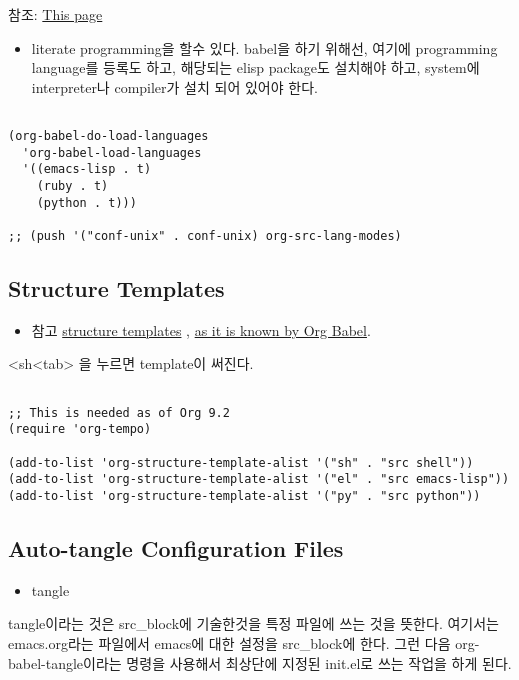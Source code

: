 \documentclass[11pt]{article}
\begin{document}
참조:  \href{https://orgmode.org/worg/org-contrib/babel/languages.html}{This page} 
\begin{itemize}
\item literate programming을 할수 있다.  babel을 하기 위해선, 여기에 programming language를 등록도 하고, 해당되는 elisp package도 설치해야 하고, system에 interpreter나 compiler가 설치 되어 있어야 한다.
\end{itemize}

\begin{verbatim}

(org-babel-do-load-languages
  'org-babel-load-languages
  '((emacs-lisp . t)
    (ruby . t)
    (python . t)))

;; (push '("conf-unix" . conf-unix) org-src-lang-modes)

\end{verbatim}
\subsection*{Structure Templates}
\label{sec:orgb3db85f}
\begin{itemize}
\item 참고
\href{https://orgmode.org/manual/Structure-Templates.html}{structure templates} , \href{https://orgmode.org/worg/org-contrib/babel/languages.html}{as it is known by Org Babel}.
\end{itemize}
<sh<tab> 을 누르면 template이 써진다.
\begin{verbatim}

;; This is needed as of Org 9.2
(require 'org-tempo)

(add-to-list 'org-structure-template-alist '("sh" . "src shell"))
(add-to-list 'org-structure-template-alist '("el" . "src emacs-lisp"))
(add-to-list 'org-structure-template-alist '("py" . "src python"))

\end{verbatim}

\subsection*{Auto-tangle Configuration Files}
\label{sec:org213c323}
\begin{itemize}
\item tangle
\end{itemize}
tangle이라는 것은 src\_block에 기술한것을 특정 파일에 쓰는 것을
뜻한다. 여기서는 emacs.org라는 파일에서 emacs에 대한 설정을
src\_block에 한다. 그런 다음 org-babel-tangle이라는 명령을 사용해서
최상단에 지정된 init.el로 쓰는 작업을 하게 된다.
\end{document}
